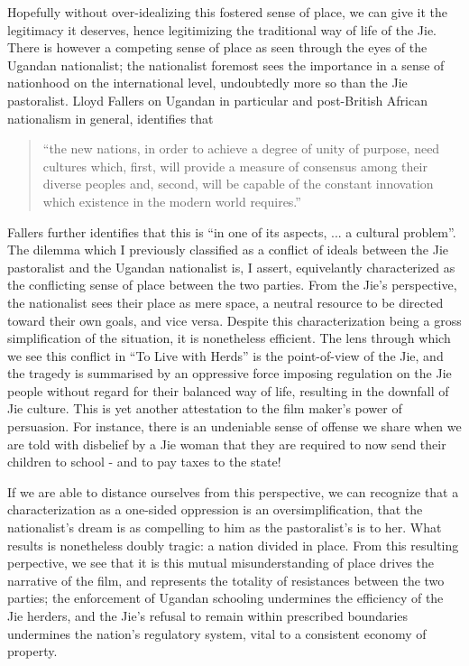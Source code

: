 \documentclass[12pt, letterpaper, oneside]{article}
\begin{document}
Hopefully without over-idealizing this fostered sense of place, we can give it the legitimacy it deserves, hence legitimizing the traditional way of life of the Jie. There is however a competing sense of place as seen through the eyes of the Ugandan nationalist; the nationalist foremost sees the importance in a sense of nationhood on the international level, undoubtedly more so than the Jie pastoralist. Lloyd Fallers on Ugandan in particular and post-British African nationalism in general, identifies that 
\begin{quote}
``the new nations, in order to achieve a degree of unity of purpose, need cultures which, first, will provide a measure of consensus among their diverse peoples and, second, will be capable of the constant innovation which existence in the modern world requires.''
\end{quote}
Fallers further identifies that this is ``in one of its aspects, ... a cultural problem''. The dilemma which I previously classified as a conflict of ideals between the Jie pastoralist and the Ugandan nationalist is, I assert, equivelantly characterized as the conflicting sense of place between the two parties. From the Jie's perspective, the nationalist sees their place as mere space, a neutral resource to be directed toward their own goals, and vice versa. Despite this characterization being a gross simplification of the situation, it is nonetheless efficient. The lens through which we see this conflict in ``To Live with Herds'' is the point-of-view of the Jie, and the tragedy is summarised by an oppressive force imposing regulation on the Jie people without regard for their balanced way of life, resulting in the downfall of Jie culture. This is yet another attestation to the film maker's power of persuasion. For instance, there is an undeniable sense of offense we share when we are told with disbelief by a Jie woman that they are required to now send their children to school - and to pay taxes to the state! 

If we are able to distance ourselves from this perspective, we can recognize that a characterization as a one-sided oppression is an oversimplification, that the nationalist's dream is as compelling to him as the pastoralist's is to her. What results is nonetheless doubly tragic: a nation divided in place. From this resulting perpective, we see that it is this mutual misunderstanding of place drives the narrative of the film, and represents the totality of resistances between the two parties; the enforcement of Ugandan schooling undermines the efficiency of the Jie herders, and the Jie's refusal to remain within prescribed boundaries undermines the nation's regulatory system, vital to a consistent economy of property.
\end{document}
